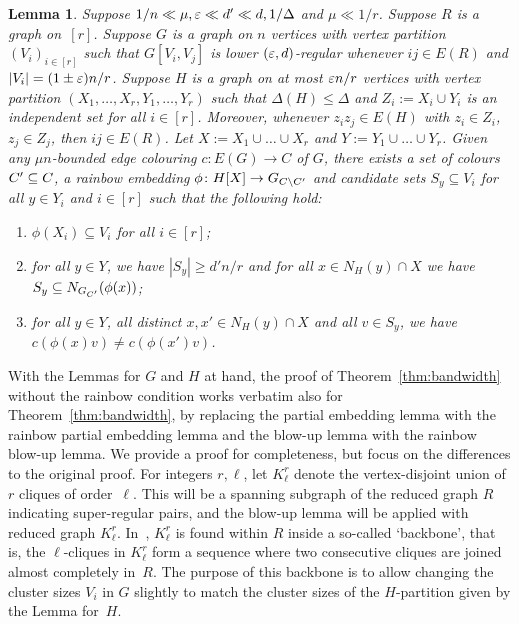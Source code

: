 \documentclass[10pt]{amsart}
\newtheorem{lemma}[algorithm]{Lemma}
\theoremstyle{definition}
\theoremstyle{claimstyle}
\theoremstyle{stepstyle}
\numberwithin{equation}{section}
\begin{document}
\begin{lemma}\label{lem:partemb}
Suppose $1/n\ll\mu, {\varepsilon} \ll d' \ll  d,1/\Delta$ and $\mu \ll 1/r$.
Suppose $R$ is a graph on~$[r]$.
Suppose $G$ is a graph on $n$ vertices with vertex partition $(V_i)_{i\in [r]}$
such that $G[V_i,V_j]$ is lower $({\varepsilon},d)$-regular whenever $ij\in E(R)$
and $|V_i|=(1\pm {\varepsilon})n/r$.
Suppose $H$ is a graph on at most ${\varepsilon} n/r$ vertices with vertex partition $(X_1,\ldots,X_r,Y_1,\ldots,Y_r)$
such that $\Delta(H)\leq \Delta$ and $Z_i:=X_i\cup Y_i$ is an independent set for all $i\in [r]$.
Moreover,
whenever $z_iz_{j}\in E(H)$ with $z_i\in Z_i$, $z_{j}\in Z_{j}$, then $ij\in E(R)$.
Let $X:= X_1\cup \ldots \cup X_r$ and $Y:=Y_1\cup \ldots \cup Y_r$.
Given any $\mu n$-bounded edge colouring $c\colon E(G)\to C$ of $G$,
there exists a set of colours $C'\subseteq C$, a rainbow embedding $\phi\colon H[X]\to G_{C\setminus C'}$  
and candidate sets $S_y\subseteq V_i$ for all $y\in Y_i$ and $i\in [r]$
such that the following hold:
\begin{enumerate}[label={\rm (\roman*)}]
\item $\phi(X_i)\subseteq V_i$ for all $i\in [r]$;
\item for all $y\in Y$, we have $|S_y|\geq d' n/r$ and for all $x\in N_H(y)\cap X$ we have $S_y\subseteq N_{G_{C'}}(\phi(x))$;
\item for all $y\in Y$, all distinct $x,x'\in N_H(y)\cap X$ and all $v\in S_y$, we have $c(\phi(x)v)\neq c(\phi(x')v)$.
\end{enumerate}
\end{lemma}

With the Lemmas for $G$ and $H$ at hand,
the proof of Theorem~\ref{thm:bandwidth} without the rainbow condition
works verbatim also for Theorem~\ref{thm:bandwidth}, by replacing the partial embedding lemma with the rainbow partial embedding lemma and the blow-up lemma with the rainbow blow-up lemma.
We provide a proof for completeness, but focus on the differences to the original proof. 
For integers $r,\ell$,
let $K^r_\ell$ denote the vertex-disjoint union of $r$ cliques of order~$\ell$. This will be a spanning subgraph of the reduced graph $R$ indicating super-regular pairs, and the blow-up lemma will be applied with reduced graph $K^r_\ell$. In~\cite{BST:09}, $K^r_\ell$ is found within $R$ inside a so-called `backbone', that is, the $\ell$-cliques in $K^r_\ell$ form a sequence where two consecutive cliques are joined almost completely in~$R$. The purpose of this backbone is to allow changing the cluster sizes $V_i$ in $G$ slightly to match the cluster sizes of the $H$-partition given by the Lemma for~$H$.
\end{document}
